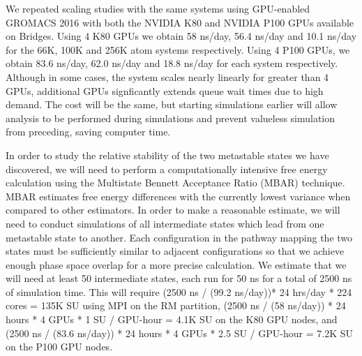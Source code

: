 We repeated scaling studies with the same systems using GPU-enabled 
GROMACS 2016 with both the NVIDIA K80 and NVIDIA P100 GPUs available on
Bridges. Using 4 K80 GPUs we obtain 58 ns/day, 56.4 ns/day and 10.1 ns/day
for the 66K, 100K and 256K atom systems respectively. Using 4 P100 GPUs, 
we obtain 83.6 ns/day, 62.0 ns/day and 18.8 ns/day for each system 
respectively. Although in some cases, the system scales nearly linearly
for greater than 4 GPUs, additional GPUs signficantly extends queue wait
times due to high demand. The cost will be the same, but starting simulations
earlier will allow analysis to be performed during simulations and prevent
valueless simulation from preceding, saving computer time. 

In order to study the relative stability of the two metastable states
we have discovered, we will need to perform a computationally 
intensive free energy calculation using the Multistate Bennett
Acceptance Ratio (MBAR) technique. MBAR estimates free energy 
differences with the currently lowest variance when compared to other
estimators. In order to make a reasonable estimate, we will need to 
conduct simulations of all intermediate states which lead from one metastable
state to another. Each configuration in the pathway mapping the two
states must be sufficiently similar to adjacent configurations so that
we achieve enough phase space overlap for a more precise calculation. 
We estimate that we will need at least 50 intermediate states, each run
for 50 ns for a total of 2500 ns of simulation time. This will require 
(2500 ns / (99.2 ns/day))* 24 hrs/day * 224 cores = 135K SU using
MPI on the RM partition, (2500 ns / (58 ns/day)) * 24 hours * 4 GPUs * 1 SU
/ GPU-hour = 4.1K SU on the K80 GPU nodes, and (2500 ns / (83.6 ns/day)) 
* 24 hours * 4 GPUs * 2.5 SU / GPU-hour = 7.2K SU on the P100 GPU nodes.

